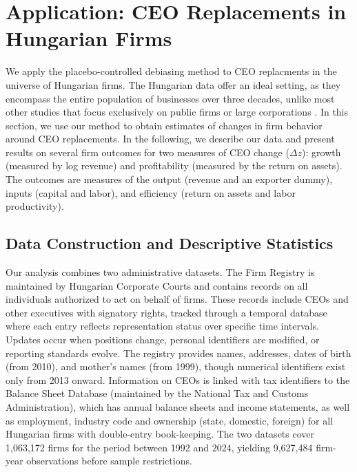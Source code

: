 \documentclass[sigconf,nonacm]{acmart}
\begin{document}
\clearpage
\nobalance
\section{Application: CEO Replacements in Hungarian Firms}\label{sec:application}

We apply the placebo-controlled debiasing method to CEO replacments in the universe of Hungarian firms. The Hungarian data offer an ideal setting, as they encompass the entire population of businesses over three decades, unlike most other studies that focus exclusively on public firms or large corporations \citep{Bertrand2003-io, crossland2011differences, quigley2015has}. In this section, we use our method to obtain estimates of changes in firm behavior around CEO replacements. In the following, we describe our data and present results on several firm outcomes for two measures of CEO change ($\Delta z$): growth (measured by log revenue) and profitability (measured by the return on assets). The outcomes are measures of the output (revenue and an exporter dummy), inputs (capital and labor), and efficiency (return on assets and labor productivity).

\subsection{Data Construction and Descriptive Statistics}\label{sec:data}

Our analysis combines two administrative datasets. The Firm Registry is maintained by Hungarian Corporate Courts and contains records on all individuals authorized to act on behalf of firms. These records include CEOs and other executives with signatory rights, tracked through a temporal database where each entry reflects representation status over specific time intervals. Updates occur when positions change, personal identifiers are modified, or reporting standards evolve. The registry provides names, addresses, dates of birth (from 2010), and mother’s names (from 1999), though numerical identifiers exist only from 2013 onward. Information on CEOs is linked with tax identifiers to the Balance Sheet Database (maintained by the National Tax and Customs Administration), which has annual balance sheets and income statements, as well as employment, industry code and ownership (state, domestic, foreign) for all Hungarian firms with double-entry book-keeping. The two datasets cover 1,063,172 firms for the period between 1992 and 2024, yielding 9,627,484 firm-year observations before sample restrictions.
\end{document}
